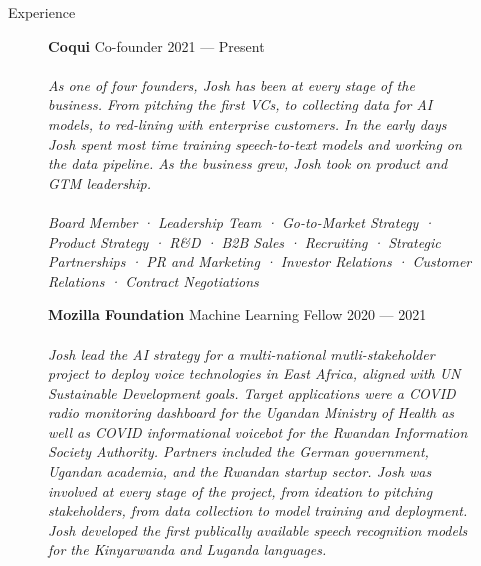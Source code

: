 \documentclass{resume} %
\begin{document}
\begin{rSection}{Experience}

  \begin{figure}[H]
    \begin{minipage}{0.2\textwidth}
      \centering
        
      \end{minipage}
      \begin{minipage}{0.8\textwidth}
          {\bf Coqui} \hfill  Co-founder \hspace{0.5cm} {2021 --- Present} \\ \\
          \textit{As one of four founders, Josh has been at every stage of the business. From pitching the first VCs, to collecting data for AI models, to red-lining with enterprise customers. In the early days Josh spent most time training speech-to-text models and working on the data pipeline. As the business grew, Josh took on product and GTM leadership.} \\ \\
          \textit{Board Member · Leadership Team · Go-to-Market Strategy · Product Strategy · R\&D · B2B Sales · Recruiting · Strategic Partnerships · PR and Marketing · Investor Relations · Customer Relations · Contract Negotiations} \\
      \end{minipage}
  \end{figure}

  \begin{figure}[H]
    \begin{minipage}{0.2\textwidth}
      \centering
      
    \end{minipage}
    \begin{minipage}{0.8\textwidth}
      {\bf Mozilla Foundation} \hfill Machine Learning Fellow \hspace{0.5cm} {2020 --- 2021} \\ \\
      \textit{Josh lead the AI strategy for a multi-national mutli-stakeholder project to deploy voice technologies in East Africa, aligned with UN Sustainable Development goals. Target applications were a COVID radio monitoring dashboard for the Ugandan Ministry of Health as well as COVID informational voicebot for the Rwandan Information Society Authority. Partners included the German government, Ugandan academia, and the Rwandan startup sector. Josh was involved at every stage of the project, from ideation to pitching stakeholders, from data collection to model training and deployment. Josh developed the first publically available speech recognition models for the Kinyarwanda and Luganda languages.} \\
    \end{minipage}
  \end{figure}


\end{rSection}
\end{document}
